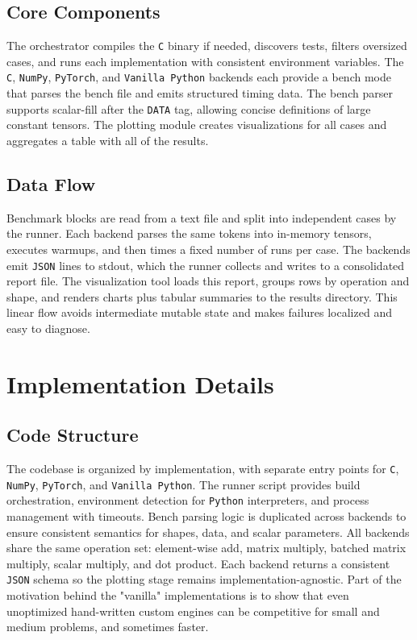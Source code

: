 \documentclass[a4paper,12pt]{article}
\begin{document}
\subsection{Core Components}
The orchestrator compiles the \texttt{C} binary if needed, discovers tests, filters oversized cases, and runs each implementation with consistent environment variables. The \texttt{C}, \texttt{NumPy}, \texttt{PyTorch}, and \texttt{Vanilla Python} backends each provide a bench mode that parses the bench file and emits structured timing data. The bench parser supports scalar-fill after the \texttt{DATA} tag, allowing concise definitions of large constant tensors. The plotting module creates visualizations for all cases and aggregates a table with all of the results.

\subsection{Data Flow}
Benchmark blocks are read from a text file and split into independent cases by the runner. Each backend parses the same tokens into in-memory tensors, executes warmups, and then times a fixed number of runs per case. The backends emit \texttt{JSON} lines to stdout, which the runner collects and writes to a consolidated report file. The visualization tool loads this report, groups rows by operation and shape, and renders charts plus tabular summaries to the results directory. This linear flow avoids intermediate mutable state and makes failures localized and easy to diagnose.

\section{Implementation Details}
\subsection{Code Structure}
The codebase is organized by implementation, with separate entry points for \texttt{C}, \texttt{NumPy}, \texttt{PyTorch}, and \texttt{Vanilla Python}. The runner script provides build orchestration, environment detection for \texttt{Python} interpreters, and process management with timeouts. Bench parsing logic is duplicated across backends to ensure consistent semantics for shapes, data, and scalar parameters. All backends share the same operation set: element-wise add, matrix multiply, batched matrix multiply, scalar multiply, and dot product. Each backend returns a consistent \texttt{JSON} schema so the plotting stage remains implementation-agnostic. Part of the motivation behind the "vanilla" implementations is to show that even unoptimized hand-written custom engines can be competitive for small and medium problems, and sometimes faster.
\end{document}
